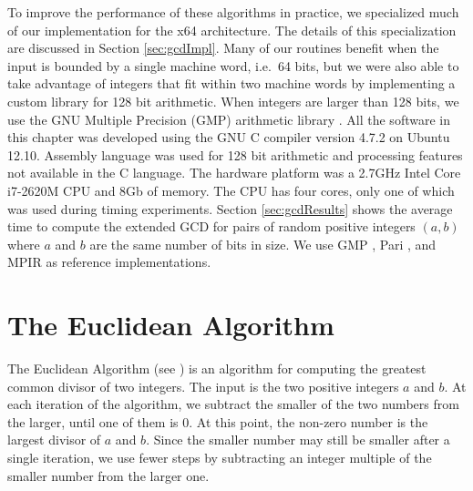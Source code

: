 \documentclass{ucalgthes1}
\theoremstyle{definition}
\newcommand{\compiler}{GNU C compiler version 4.7.2}
\newcommand{\cpu}{2.7GHz Intel Core i7-2620M CPU}
\begin{document}
To improve the performance of these algorithms in practice, we specialized much of our implementation for the x64 architecture.  The details of this specialization are discussed in Section \ref{sec:gcdImpl}.  Many of our routines benefit when the input is bounded by a single machine word, i.e.\ 64 bits, but we were also able to take advantage of integers that fit within two machine words by implementing a custom library for 128 bit arithmetic.  When integers are larger than 128 bits, we use the GNU Multiple Precision (GMP) arithmetic library \cite{Gmp}.  All the software in this chapter was developed using the \compiler{} on Ubuntu 12.10.  Assembly language was used for 128 bit arithmetic and processing features not available in the C language.  The hardware platform was a \cpu{} and 8Gb of memory.  The CPU has four cores, only one of which was used during timing experiments.  Section \ref{sec:gcdResults} shows the average time to compute the extended GCD for pairs of random positive integers $(a, b)$ where $a$ and $b$ are the same number of bits in size.  We use GMP \cite{Gmp}, Pari \cite{PariGP}, and MPIR \cite{Mpir} as reference implementations.

\section{The Euclidean Algorithm}
\label{sec:gcdEEA}

The Euclidean Algorithm (see \cite[\S 9.3.2]{Cohen2006}) is an algorithm for computing the greatest common divisor of two integers.  The input is the two positive integers $a$ and $b$.  At each iteration of the algorithm, we subtract the smaller of the two numbers from the larger, until one of them is 0. At this point, the non-zero number is the largest divisor of $a$ and $b$.  Since the smaller number may still be smaller after a single iteration, we use fewer steps by subtracting an integer multiple of the smaller number from the larger one.
\end{document}
